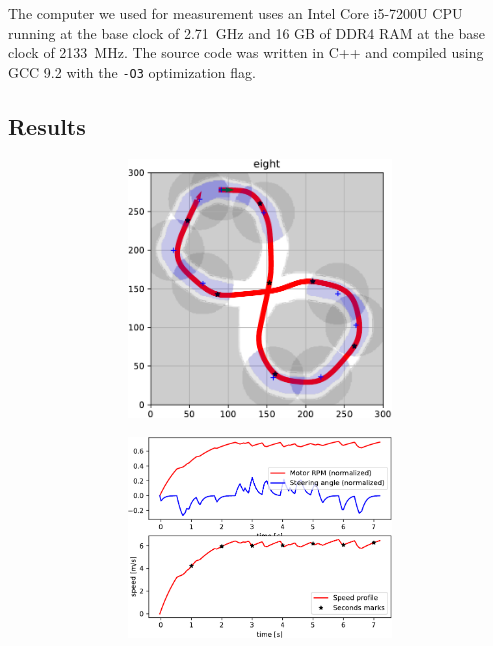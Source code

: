 The computer we used for measurement uses an Intel Core i5-7200U CPU running at the base clock of \SI{2.71}{\giga\hertz} and 16 GB of DDR4 RAM at the base clock of \SI{2133}{\mega\hertz}. The source code was written in C++ and compiled using GCC 9.2 with the \texttt{-O3} optimization flag.

\subsection{Results}

\begin{figure}[!tbp]%
	\centering
	\begin{subfigure}[t]{\textwidth}
		\begin{subfigure}[t]{0.45\textwidth}
			\includegraphics[width=\textwidth]{../img/experiments/eight-hybrid_astar-trajectory}
		\end{subfigure}
		\hfill
		\begin{subfigure}[t]{0.45\textwidth}
			\includegraphics[width=\textwidth]{../img/experiments/eight-hybrid_astar-actuators}

\end{subfigure}
\end{subfigure}
\end{figure}
